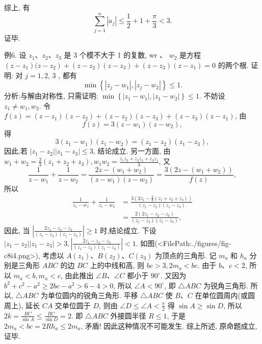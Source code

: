 综上, 有
$$
\sum_{j=1}^n\left|a_j\right| \leqslant \frac{1}{2}+1+\frac{\pi}{3}<3 .
$$
证毕.



例6. 设 $z_1 、 z_2 、 z_3$ 是 3 个模不大于 1 的复数, wr 、 $w_2$ 是方程 $\left(z-z_1\right)(z- \left.z_2\right)+\left(z-z_2\right)\left(z-z_3\right)+\left(z-z_3\right)\left(z-z_1\right)=0$ 的两个根.
证明: 对 $j=1,2$, 3 , 都有
$$
\min \left\{\left|z_j-w_1\right|,\left|z_j-w_2\right|\right\} \leqslant 1 .
$$
分析:与解由对称性, 只需证明: $\min \left\{\left|z_1-w_1\right|,\left|z_1-w_2\right|\right\} \leqslant 1$.
不妨设 $z_1 \neq w_1, w_2$. 令 $f(z)=\left(z-z_1\right)\left(z-z_2\right)+\left(z-z_2\right)\left(z-z_3\right)+ \left(z-z_3\right)\left(z-z_1\right)$, 由
$$
f(z)=3\left(z-w_1\right)\left(z-w_2\right),
$$
得
$$
3\left(z_1-w_1\right)\left(z_1-w_2\right)=\left(z_1-z_2\right)\left(z_1-z_3\right),
$$
因此,若 $\left|z_1-z_2\right|\left|z_1-z_3\right| \leqslant 3$, 结论成立.
另一方面, 由 $w_1+w_2=\frac{2}{3}\left(z_1+z_2+z_3\right), w_1 w_2=\frac{z_1 z_2+z_2 z_3+z_3 z_1}{3}$,
又
$$
\frac{1}{z-w_1}+\frac{1}{z-w_2}=\frac{2 z-\left(w_1+w_2\right)}{\left(z-w_1\right)\left(z-w_2\right)}=\frac{3\left(2 z-\left(w_1+w_2\right)\right)}{f(z)},
$$
所以
$$
\begin{aligned}
\frac{1}{z_1-w_1}+\frac{1}{z_1-w_2} & =\frac{3\left(2 z_1-\frac{2}{3}\left(z_1+z_2+z_3\right)\right)}{\left(z_1-z_2\right)\left(z_1-z_3\right)} \\
& =\frac{2\left(2 z_1-z_2-z_3\right)}{\left(z_1-z_2\right)\left(z_1-z_3\right)},
\end{aligned}
$$
因此, 当 $\left|\frac{2 z_1-z_2-z_3}{\left(z_1-z_2\right)\left(z_1-z_3\right)}\right| \geqslant 1$ 时,结论成立.
下设 $\left|z_1-z_2\right|\left|z_1-z_3\right|>3,\left|\frac{2 z_1-z_2-z_3}{\left(z_1-z_2\right)\left(z_1-z_3\right)}\right|<1$.
如图(<FilePath:./figures/fig-c8i4.png>), 考虑以 $A\left(z_1\right) 、 B\left(z_2\right) 、 C\left(z_3\right)$ 为顶点的三角形.
记 $m_a$ 和 $h_a$ 分别是三角形 $A B C$ 的边 $B C$ 上的中线和高, 则 $b c>3,2 m_a<b c$.
由于 $b 、 c<2$, 所以 $m_a<b, m_a<c$, 由此推出 $\angle B 、 \angle C$ 都小于 $90^{\circ}$.
又因为 $b^2+c^2-a^2 \geqslant 2 b c-a^2>6-4>0$, 所以 $\angle A<90^{\circ}$, 即 $\triangle A B C$ 为锐角三角形.
所以, $\triangle A B C$ 为单位圆内的锐角三角形.
平移 $\triangle A B C$ 
使 $B 、 C$ 在单位圆周内(或圆周上), 延长 $C A$ 交单位圆于 $D$, 则由 $\angle D \leqslant \angle A<\frac{\pi}{2}$ 得 $\sin A \geqslant \sin D$, 所以 $2 k=\frac{B C}{\sin A} \leqslant \frac{B C}{\sin D}=2$. 即 $\triangle A B C$ 外接圆半径 $R \leqslant 1$, 于是 $2 m_a<b c=2 R h_a \leqslant 2 m_a$, 矛盾! 因此这种情况不可能发生.
综上所述, 原命题成立, 证毕.



